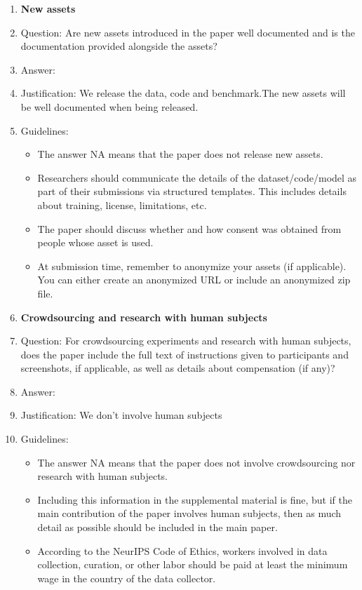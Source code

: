 \documentclass{article}
\theoremstyle{plain}
\theoremstyle{definition}
\theoremstyle{remark}
\begin{document}
\begin{enumerate}
\item {\bf New assets}
    \item[] Question: Are new assets introduced in the paper well documented and is the documentation provided alongside the assets?
    \item[] Answer: \answerYes{} %
    \item[] Justification: We release the data, code and benchmark.The new assets will be well documented when being released.
    \item[] Guidelines:
    \begin{itemize}
        \item The answer NA means that the paper does not release new assets.
        \item Researchers should communicate the details of the dataset/code/model as part of their submissions via structured templates. This includes details about training, license, limitations, etc. 
        \item The paper should discuss whether and how consent was obtained from people whose asset is used.
        \item At submission time, remember to anonymize your assets (if applicable). You can either create an anonymized URL or include an anonymized zip file.
    \end{itemize}

\item {\bf Crowdsourcing and research with human subjects}
    \item[] Question: For crowdsourcing experiments and research with human subjects, does the paper include the full text of instructions given to participants and screenshots, if applicable, as well as details about compensation (if any)? 
    \item[] Answer: \answerNA{} %
    \item[] Justification: We don’t involve human subjects
    \item[] Guidelines:
    \begin{itemize}
        \item The answer NA means that the paper does not involve crowdsourcing nor research with human subjects.
        \item Including this information in the supplemental material is fine, but if the main contribution of the paper involves human subjects, then as much detail as possible should be included in the main paper. 
        \item According to the NeurIPS Code of Ethics, workers involved in data collection, curation, or other labor should be paid at least the minimum wage in the country of the data collector. 
    \end{itemize}


\end{enumerate}
\end{document}
